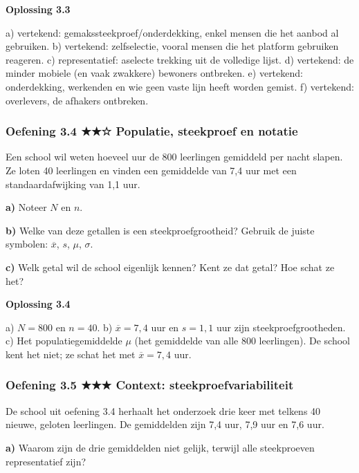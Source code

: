 \begin{oplossing}
\textbf{Oplossing 3.3}

a) vertekend: gemakssteekproef/onderdekking, enkel mensen die het aanbod al gebruiken. b) vertekend: zelfselectie, vooral mensen die het platform gebruiken reageren. c) representatief: aselecte trekking uit de volledige lijst. d) vertekend: de minder mobiele (en vaak zwakkere) bewoners ontbreken. e) vertekend: onderdekking, werkenden en wie geen vaste lijn heeft worden gemist. f) vertekend: overlevers, de afhakers ontbreken.
\end{oplossing}

\subsubsection*{Oefening 3.4 \quad ★★☆ \quad Populatie, steekproef en notatie}

Een school wil weten hoeveel uur de 800 leerlingen gemiddeld per nacht slapen. Ze loten 40 leerlingen en vinden een gemiddelde van 7,4 uur met een standaardafwijking van 1,1 uur.

\textbf{a)} Noteer $N$ en $n$. \lijn

\textbf{b)} Welke van deze getallen is een steekproefgrootheid? Gebruik de juiste symbolen: $\overline{x}$, $s$, $\mu$, $\sigma$. \lijn

\textbf{c)} Welk getal wil de school eigenlijk kennen? Kent ze dat getal? Hoe schat ze het? \lijn

\begin{oplossing}
\textbf{Oplossing 3.4}

a) $N=800$ en $n=40$. b) $\overline{x}=7{,}4$ uur en $s=1{,}1$ uur zijn steekproefgrootheden. c) Het populatiegemiddelde $\mu$ (het gemiddelde van alle 800 leerlingen). De school kent het niet; ze schat het met $\overline{x}=7{,}4$ uur.
\end{oplossing}

\subsubsection*{Oefening 3.5 \quad ★★★ \quad Context: steekproefvariabiliteit}

De school uit oefening 3.4 herhaalt het onderzoek drie keer met telkens 40 nieuwe, geloten leerlingen. De gemiddelden zijn 7,4 uur, 7,9 uur en 7,6 uur.

\textbf{a)} Waarom zijn de drie gemiddelden niet gelijk, terwijl alle steekproeven representatief zijn? \lijn

